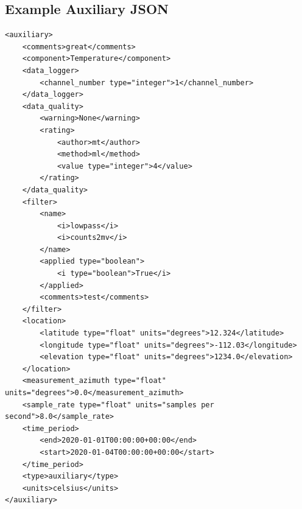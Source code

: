 \documentclass[12pt]{article}
\begin{document}

\newpage
\subsection{Example Auxiliary JSON} 

\begin{verbatim}
<auxiliary>
    <comments>great</comments>
    <component>Temperature</component>
    <data_logger>
        <channel_number type="integer">1</channel_number>
    </data_logger>
    <data_quality>
        <warning>None</warning>
        <rating>
            <author>mt</author>
            <method>ml</method>
            <value type="integer">4</value>
        </rating>
    </data_quality>
    <filter>
        <name>
            <i>lowpass</i>
            <i>counts2mv</i>
        </name>
        <applied type="boolean">
            <i type="boolean">True</i>
        </applied>
        <comments>test</comments>
    </filter>
    <location>
        <latitude type="float" units="degrees">12.324</latitude>
        <longitude type="float" units="degrees">-112.03</longitude>
        <elevation type="float" units="degrees">1234.0</elevation>
    </location>
    <measurement_azimuth type="float" units="degrees">0.0</measurement_azimuth>
    <sample_rate type="float" units="samples per second">8.0</sample_rate>
    <time_period>
        <end>2020-01-01T00:00:00+00:00</end>
        <start>2020-01-04T00:00:00+00:00</start>
    </time_period>
    <type>auxiliary</type>
    <units>celsius</units>
</auxiliary>
\end{verbatim}
\end{document}
